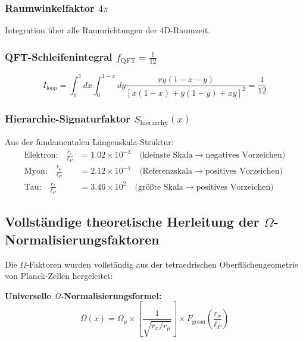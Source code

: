 \documentclass[12pt,a4paper]{article}
\numberwithin{equation}{section}
\newcommand{\fQFT}{f_{\text{QFT}}}
\newcommand{\lP}{\ell_P}
\newcommand{\Omegafactor}{\Omega}
\begin{document}
	\subsubsection{Raumwinkelfaktor $4\pi$}
	Integration über alle Raumrichtungen der 4D-Raumzeit.
	
	\subsubsection{QFT-Schleifenintegral $\fQFT = \frac{1}{12}$}
	\begin{equation}
		I_{\text{loop}} = \int_0^1 dx \int_0^{1-x} dy \frac{xy(1-x-y)}{[x(1-x) + y(1-y) + xy]^2} = \frac{1}{12}
		\label{eq:loop_integral}
	\end{equation}
	
	\subsubsection{Hierarchie-Signaturfaktor $S_{\text{hierarchy}}(x)$}
	
	Aus der fundamentalen Längenskala-Struktur:
	\begin{align}
		\text{Elektron:} \quad \frac{r_e}{\ell_P} &= 1.02 \times 10^{-3} \quad \text{(kleinste Skala} \rightarrow \text{negatives Vorzeichen)}\\
		\text{Myon:} \quad \frac{r_\mu}{\ell_P} &= 2.12 \times 10^{-1} \quad \text{(Referenzskala} \rightarrow \text{positives Vorzeichen)}\\
		\text{Tau:} \quad \frac{r_\tau}{\ell_P} &= 3.46 \times 10^{2} \quad \text{(größte Skala} \rightarrow \text{positives Vorzeichen)}
		\label{eq:length_scales}
	\end{align}
	
	\subsection{Vollständige theoretische Herleitung der $\Omega$-Normalisierungsfaktoren}
	
	Die $\Omega$-Faktoren wurden vollständig aus der tetraedrischen Oberflächengeometrie von Planck-Zellen hergeleitet:
	
	\textbf{Universelle $\Omegafactor$-Normalisierungsformel:}
	\begin{equation}
		\Omegafactor(x) = \Omegafactor_\mu \times \left[\frac{1}{\sqrt{r_x/r_\mu}}\right] \times F_{\text{geom}}\left(\frac{r_x}{\lP}\right)
		\label{eq:omega_universal}
	\end{equation}
	
\end{document}
